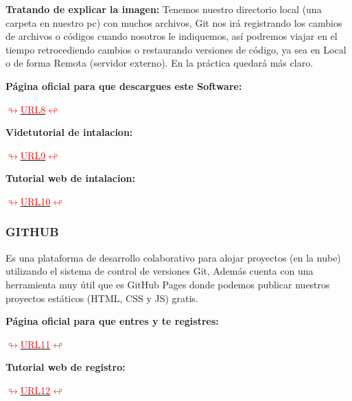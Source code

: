 \textbf{Tratando de explicar la imagen:} Tenemos nuestro directorio local (una carpeta en nuestro pc) con muchos archivos, Git nos irá registrando los cambios de archivos o códigos cuando nosotros le indiquemos, así podremos viajar en el tiempo retrocediendo cambios o restaurando versiones de código, ya sea en Local o de forma Remota (servidor externo). En la práctica quedará más claro.\cite{noauthor_introduccion_nodate}

\textbf{Página oficial para que descargues este Software: }
\begin{minipage}[c]{0,17 \textwidth}
 \href{https://git-scm.com/}{
 \def\svgwidth{0.9\textwidth}
 } 
 \end{minipage}\hyperlink{git}{\textcolor{red}{$\looparrowright$URL8$\looparrowleft$}}


 \textbf{Videtutorial de intalacion: }
 \begin{minipage}[c]{0,17 \textwidth}
  \href{https://youtu.be/h9ZH2wFpSUc}{
  \def\svgwidth{0.9\textwidth}
  } 
  \end{minipage}\hyperlink{videogit}{\textcolor{red}{$\looparrowright$URL9$\looparrowleft$}}



  \textbf{ Tutorial web de intalacion:}
  \begin{minipage}[c]{0,17 \textwidth}
  \href{https://www.mclibre.org/consultar/informatica/lecciones/git-instalacion.html}{
  \def\svgwidth{0.9\textwidth}
  } 
  \end{minipage}\hyperlink{texgit}{\textcolor{red}{$\looparrowright$URL10$\looparrowleft$}}
  
  \subsubsection{GITHUB}
Es una plataforma de desarrollo colaborativo para alojar proyectos (en la nube) utilizando el sistema de control de versiones Git, Además cuenta con una herramienta muy útil que es GitHub Pages donde podemos publicar nuestros proyectos estáticos (HTML, CSS y JS) gratis.\cite{noauthor_introduccion_nodate}

\textbf{Página oficial para que entres y te registres:}
\begin{minipage}[c]{0,17 \textwidth}
 \href{https://github.com/}{
 \def\svgwidth{0.9\textwidth}
 } 
 \end{minipage}\hyperlink{github}{\textcolor{red}{$\looparrowright$URL11$\looparrowleft$}}

 \textbf{Tutorial web de registro:}
 \begin{minipage}[c]{0,17 \textwidth}
 \href{https://git-scm.com/book/es/v2/GitHub-Creaci%C3%B3n-y-configuraci%C3%B3n-de-la-cuenta}{
 \def\svgwidth{0.9\textwidth}
 } 
 \end{minipage}\hyperlink{tutogithubt}{\textcolor{red}{$\looparrowright$URL12$\looparrowleft$}}
 \newpage 




